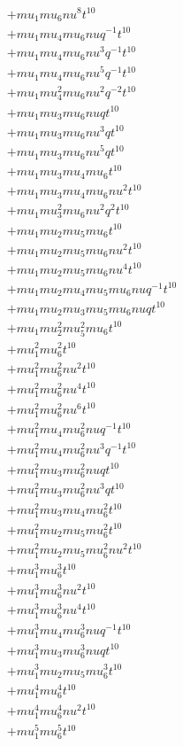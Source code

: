 \begin{align*}
  + mu_1 mu_6 nu^{8} t^{10} \\
  + mu_1 mu_4 mu_6 nu q^{-1} t^{10} \\
  + mu_1 mu_4 mu_6 nu^{3} q^{-1} t^{10} \\
  + mu_1 mu_4 mu_6 nu^{5} q^{-1} t^{10} \\
  + mu_1 mu_4^{2} mu_6 nu^{2} q^{-2} t^{10} \\
  + mu_1 mu_3 mu_6 nu q t^{10} \\
  + mu_1 mu_3 mu_6 nu^{3} q t^{10} \\
  + mu_1 mu_3 mu_6 nu^{5} q t^{10} \\
  + mu_1 mu_3 mu_4 mu_6 t^{10} \\
  + mu_1 mu_3 mu_4 mu_6 nu^{2} t^{10} \\
  + mu_1 mu_3^{2} mu_6 nu^{2} q^{2} t^{10} \\
  + mu_1 mu_2 mu_5 mu_6 t^{10} \\
  + mu_1 mu_2 mu_5 mu_6 nu^{2} t^{10} \\
  + mu_1 mu_2 mu_5 mu_6 nu^{4} t^{10} \\
  + mu_1 mu_2 mu_4 mu_5 mu_6 nu q^{-1} t^{10} \\
  + mu_1 mu_2 mu_3 mu_5 mu_6 nu q t^{10} \\
  + mu_1 mu_2^{2} mu_5^{2} mu_6 t^{10} \\
  + mu_1^{2} mu_6^{2} t^{10} \\
  + mu_1^{2} mu_6^{2} nu^{2} t^{10} \\
  + mu_1^{2} mu_6^{2} nu^{4} t^{10} \\
  + mu_1^{2} mu_6^{2} nu^{6} t^{10} \\
  + mu_1^{2} mu_4 mu_6^{2} nu q^{-1} t^{10} \\
  + mu_1^{2} mu_4 mu_6^{2} nu^{3} q^{-1} t^{10} \\
  + mu_1^{2} mu_3 mu_6^{2} nu q t^{10} \\
  + mu_1^{2} mu_3 mu_6^{2} nu^{3} q t^{10} \\
  + mu_1^{2} mu_3 mu_4 mu_6^{2} t^{10} \\
  + mu_1^{2} mu_2 mu_5 mu_6^{2} t^{10} \\
  + mu_1^{2} mu_2 mu_5 mu_6^{2} nu^{2} t^{10} \\
  + mu_1^{3} mu_6^{3} t^{10} \\
  + mu_1^{3} mu_6^{3} nu^{2} t^{10} \\
  + mu_1^{3} mu_6^{3} nu^{4} t^{10} \\
  + mu_1^{3} mu_4 mu_6^{3} nu q^{-1} t^{10} \\
  + mu_1^{3} mu_3 mu_6^{3} nu q t^{10} \\
  + mu_1^{3} mu_2 mu_5 mu_6^{3} t^{10} \\
  + mu_1^{4} mu_6^{4} t^{10} \\
  + mu_1^{4} mu_6^{4} nu^{2} t^{10} \\
  + mu_1^{5} mu_6^{5} t^{10}
\end{align*}
